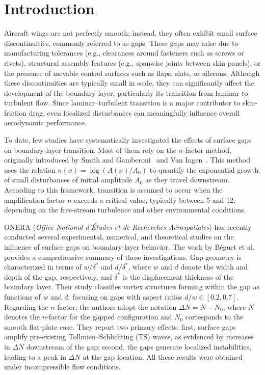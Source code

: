 \documentclass[../main.tex]{subfiles}
\begin{document}
\section{Introduction}

Aircraft wings are not perfectly smooth; instead, they often exhibit small surface discontinuities, commonly referred to as gaps. These gaps may arise due to manufacturing tolerances (e.g., clearances around fasteners such as screws or rivets), structural assembly features (e.g., spanwise joints between skin panels), or the presence of movable control surfaces such as flaps, slats, or ailerons. Although these discontinuities are typically small in scale, they can significantly affect the development of the boundary layer, particularly its transition from laminar to turbulent flow. Since laminar--turbulent transition is a major contributor to skin-friction drag, even localized disturbances can meaningfully influence overall aerodynamic performance.

To date, few studies have systematically investigated the effects of surface gaps on boundary-layer transition. Most of them rely on the $n$-factor method, originally introduced by Smith and Gamberoni~\cite{smithgamberoni} and Van Ingen~\cite{vanIngen1956}. This method uses the relation $n(x) = \log(A(x)/A_0)$ to quantify the exponential growth of small disturbances of initial amplitude $A_0$ as they travel downstream. According to this framework, transition is assumed to occur when the amplification factor $n$ exceeds a critical value, typically between 5 and 12, depending on the free-stream turbulence and other environmental conditions.

ONERA (\emph{Office National d'Études et de Recherches Aérospatiales}) has recently conducted several experimental, numerical, and theoretical studies on the influence of surface gaps on boundary-layer behavior. The work by B\'eguet et al.~\cite{beguetONERA} provides a comprehensive summary of these investigations. Gap geometry is characterized in terms of $w/\delta^*$ and $d/\delta^*$, where $w$ and $d$ denote the width and depth of the gap, respectively, and $\delta^*$ is the displacement thickness of the boundary layer. Their study classifies vortex structures forming within the gap as functions of $w$ and $d$, focusing on gaps with aspect ratios $d/w \in [0.2, 0.7]$. Regarding the $n$-factor, the authors adopt the notation $\Delta N = N - N_0$, where $N$ denotes the $n$-factor for the gapped configuration and $N_0$ corresponds to the smooth flat-plate case. They report two primary effects: first, surface gaps amplify pre-existing Tollmien--Schlichting (TS) waves, as evidenced by increases in $\Delta N$ downstream of the gap; second, the gaps generate localized instabilities, leading to a peak in $\Delta N$ at the gap location. All these results were obtained under incompressible flow conditions.
\end{document}
